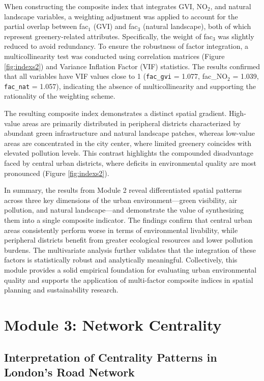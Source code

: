 \documentclass[
  12pt,
  oneside]{book}
\begin{document}
When constructing the composite index that integrates GVI, NO\(_2\), and natural landscape variables, a weighting adjustment was applied to account for the partial overlap between fac\(_1\) (GVI) and fac\(_3\) (natural landscape), both of which represent greenery-related attributes. Specifically, the weight of fac\(_3\) was slightly reduced to avoid redundancy. To ensure the robustness of factor integration, a multicollinearity test was conducted using correlation matrices (Figure \ref{fig:indexs2}) and Variance Inflation Factor (VIF) statistics. The results confirmed that all variables have VIF values close to 1 (\texttt{fac\_gvi} = 1.077, fac\_NO\(_2\) = 1.039, \texttt{fac\_nat} = 1.057), indicating the absence of multicollinearity and supporting the rationality of the weighting scheme.

The resulting composite index demonstrates a distinct spatial gradient. High-value areas are primarily distributed in peripheral districts characterized by abundant green infrastructure and natural landscape patches, whereas low-value areas are concentrated in the city center, where limited greenery coincides with elevated pollution levels. This contrast highlights the compounded disadvantage faced by central urban districts, where deficits in environmental quality are most pronounced (Figure \ref{fig:indexs2}).

In summary, the results from Module 2 reveal differentiated spatial patterns across three key dimensions of the urban environment---green visibility, air pollution, and natural landscape---and demonstrate the value of synthesizing them into a single composite indicator. The findings confirm that central urban areas consistently perform worse in terms of environmental livability, while peripheral districts benefit from greater ecological resources and lower pollution burdens. The multivariate analysis further validates that the integration of these factors is statistically robust and analytically meaningful. Collectively, this module provides a solid empirical foundation for evaluating urban environmental quality and supports the application of multi-factor composite indices in spatial planning and sustainability research.

\section{Module 3: Network Centrality}\label{module-3-network-centrality}

\subsection{Interpretation of Centrality Patterns in London's Road Network}\label{interpretation-of-centrality-patterns-in-londons-road-network}
\end{document}
